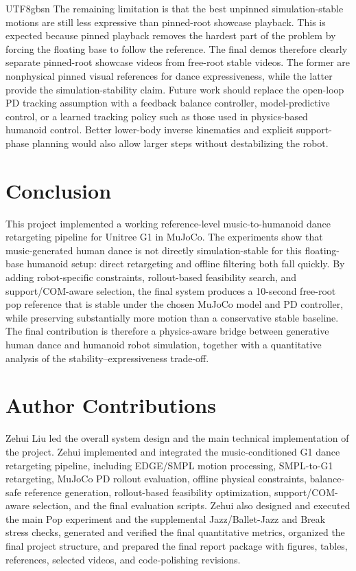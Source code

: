 \documentclass[conference]{IEEEtran}
\begin{document}
\begin{CJK*}{UTF8}{gbsn}
The remaining limitation is that the best unpinned simulation-stable motions are still less expressive than pinned-root showcase playback. This is expected because pinned playback removes the hardest part of the problem by forcing the floating base to follow the reference. The final demos therefore clearly separate pinned-root showcase videos from free-root stable videos. The former are nonphysical pinned visual references for dance expressiveness, while the latter provide the simulation-stability claim. Future work should replace the open-loop PD tracking assumption with a feedback balance controller, model-predictive control, or a learned tracking policy such as those used in physics-based humanoid control. Better lower-body inverse kinematics and explicit support-phase planning would also allow larger steps without destabilizing the robot.

\section{Conclusion}
This project implemented a working reference-level music-to-humanoid dance retargeting pipeline for Unitree G1 in MuJoCo. The experiments show that music-generated human dance is not directly simulation-stable for this floating-base humanoid setup: direct retargeting and offline filtering both fall quickly. By adding robot-specific constraints, rollout-based feasibility search, and support/COM-aware selection, the final system produces a 10-second free-root pop reference that is stable under the chosen MuJoCo model and PD controller, while preserving substantially more motion than a conservative stable baseline. The final contribution is therefore a physics-aware bridge between generative human dance and humanoid robot simulation, together with a quantitative analysis of the stability--expressiveness trade-off.

\section*{Author Contributions}
Zehui Liu led the overall system design and the main technical implementation of the project. Zehui implemented and integrated the music-conditioned G1 dance retargeting pipeline, including EDGE/SMPL motion processing, SMPL-to-G1 retargeting, MuJoCo PD rollout evaluation, offline physical constraints, balance-safe reference generation, rollout-based feasibility optimization, support/COM-aware selection, and the final evaluation scripts. Zehui also designed and executed the main Pop experiment and the supplemental Jazz/Ballet-Jazz and Break stress checks, generated and verified the final quantitative metrics, organized the final project structure, and prepared the final report package with figures, tables, references, selected videos, and code-polishing revisions.


\end{CJK*}
\end{document}
